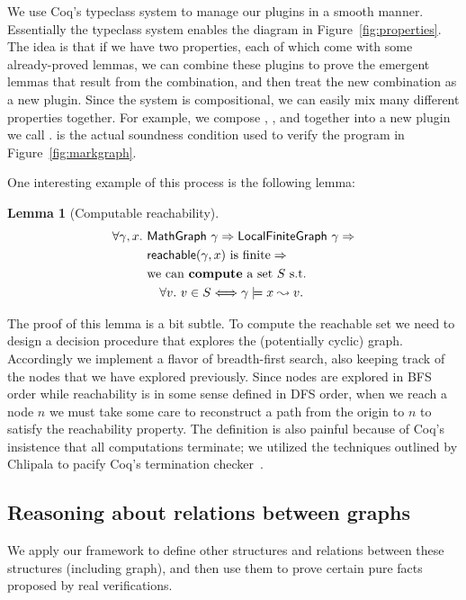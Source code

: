 We use Coq's typeclass system to manage our plugins in a smooth manner.  Essentially the typeclass system enables the diagram in Figure~\ref{fig:properties}.  The idea is that if we have two properties, each of which come with some already-proved lemmas, we can combine these plugins to prove the emergent lemmas that result from the combination, and then treat the new combination as a new plugin.  Since the system is compositional, we can easily mix many different properties together.  For example, we compose , , and  together into a new plugin we call .   is the actual soundness condition used to verify the program in Figure~\ref{fig:markgraph}.

One interesting example of this process is the following lemma:
\newtheorem{mylem}{Lemma}
\begin{mylem}[Computable reachability]\label{lem:computereach}
\[
\begin{split}
\forall \gamma, x.~&\mathsf{MathGraph}\ \gamma => \mathsf{LocalFiniteGraph}\ \gamma =>\\
        & \mathsf{reachable}(\gamma, x)\textrm{ is finite} => \\
        & \text{we can \textbf{compute} a set }S \text{ s.t.\ } \\
        & \quad \forall v.~v \in S <=> \gamma \models x \leadsto v.
\end{split}
\]
\end{mylem}
The proof of this lemma is a bit subtle.  To compute the reachable set
we need to design a decision procedure that explores the (potentially cyclic)
graph.  Accordingly we implement a flavor of breadth-first search, also keeping
track of the nodes that we have explored previously.  Since nodes are explored
in BFS order while reachability is in some sense defined in DFS order, when
we reach a node $n$ we must take some care to reconstruct a path from the origin to $n$
to satisfy the reachability property.  The definition is also
painful because of Coq's insistence that all computations terminate; we 
utilized the techniques outlined by Chlipala to pacify Coq's termination checker~\cite{chlipala:cpdt}.
 
\subsection{Reasoning about relations between graphs} %

We apply our framework to define other structures and relations
between these structures (including graph), and then use them to prove
certain pure facts proposed by real verifications.


